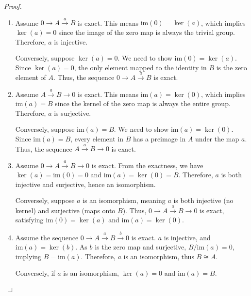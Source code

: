 \begin{proof}
	\begin{enumerate}
		\item Assume \( 0 \rightarrow A \xrightarrow{a} B \) is exact. This means \(\mathrm{im}(0) = \ker(a)\), which implies \(\ker(a) = 0\) since the image of the zero map is always the trivial group. Therefore, \(a\) is injective.
		      		      		      
		      Conversely, suppose \(\ker(a) = 0\). We need to show \(\mathrm{im}(0) = \ker(a)\). Since \(\ker(a) = 0\), the only element mapped to the identity in \(B\) is the zero element of \(A\). Thus, the sequence \(0 \rightarrow A \xrightarrow{a} B\) is exact.
		      		      		          
		\item Assume \( A \xrightarrow{a} B \rightarrow 0 \) is exact. This means \(\mathrm{im}(a) = \ker(0)\), which implies \(\mathrm{im}(a) = B\) since the kernel of the zero map is always the entire group. Therefore, \(a\) is surjective.
		      		      		      
		      Conversely, suppose \(\mathrm{im}(a) = B\). We need to show \(\mathrm{im}(a) = \ker(0)\). Since \(\mathrm{im}(a) = B\), every element in \(B\) has a preimage in \(A\) under the map \(a\). Thus, the sequence \( A \xrightarrow{a} B \rightarrow 0 \) is exact.
		      		      		      
		\item Assume \( 0 \rightarrow A \xrightarrow{a} B \rightarrow 0 \) is exact. From the exactness, we have \(\ker(a) = \mathrm{im}(0) = 0\) and \(\mathrm{im}(a) = \ker(0) = B\). Therefore, \(a\) is both injective and surjective, hence an isomorphism.
		      		      		      
		      Conversely, suppose \(a\) is an isomorphism, meaning \(a\) is both injective (no kernel) and surjective (maps onto \(B\)). Thus, \( 0 \rightarrow A \xrightarrow{a} B \rightarrow 0 \) is exact, satisfying \(\mathrm{im}(0) = \ker(a)\) and \(\mathrm{im}(a) = \ker(0)\).
		      		      		      
		\item Assume the sequence \( 0 \rightarrow A \xrightarrow{a} B \xrightarrow{b} 0 \) is exact. \(a\) is injective, and \(\mathrm{im}(a) = \ker(b)\). As \(b\) is the zero map and surjective, \( B/\mathrm{im}(a) = 0 \), implying \( B = \mathrm{im}(a) \). Therefore, \(a\) is an isomorphism, thus \( B \cong A \).
		      		      		      
		      Conversely, if \(a\) is an isomorphism, \(\ker(a) = 0\) and \(\mathrm{im}(a) = B\).
	\end{enumerate}
\end{proof}


